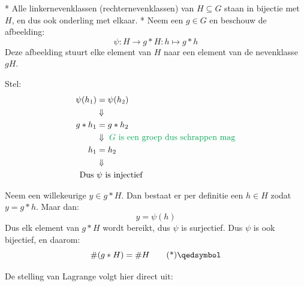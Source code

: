 \begin{center}
\resizebox{0.75\textwidth}{!}{%
    
}
\end{center}

\begin{nicetheorem}*
    Alle linkernevenklassen (rechternevenklassen) van $H \subseteq G$ staan in bijectie met $H$, en dus ook onderling met elkaar.
    \nextpart[Bewijs.]*
    Neem een $g \in G$ en beschouw de afbeelding:
    \begin{equation*}
        \psi : H \to g*H : h \mapsto g*h
    \end{equation*}
    Deze afbeelding stuurt elke element van $H$ naar een element van de nevenklasse $gH$.
    
    \vspace{0.25cm}

     Stel:
    \begin{equation*}
        \begin{aligned}
            \psi(h_1) &= \psi(h_2) \\
            &\Downarrow \\
            g * h_1 &= g * h_2 \\
            &\Downarrow \textcolor{Green}{\text{ $G$ is een groep dus schrappen mag}} \\
            h_1 &= h_2 \\
            &\Downarrow \\
            \text{Dus } &\psi \text{ is injectief}
        \end{aligned}
    \end{equation*}

     Neem een willekeurige $y \in g*H$. Dan bestaat er per definitie een $h \in H$ zodat $y = g * h$. Maar dan:
    \begin{equation*}
        y = \psi(h)
    \end{equation*}
    Dus elk element van $g*H$ wordt bereikt, dus $\psi$ is surjectief. Dus $\psi$ is ook bijectief, en daarom:
    \begin{equation}
        \#(g*H) = \# H \qedtag
    \end{equation}
\end{nicetheorem}

De stelling van Lagrange volgt hier direct uit:

